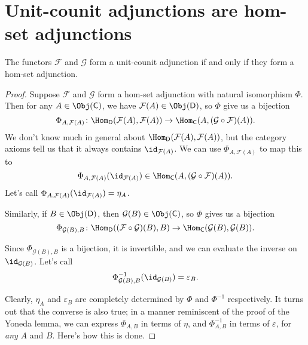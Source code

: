 \documentclass[notes.tex]{subfiles}
\begin{document}
\section{Unit-counit adjunctions are hom-set adjunctions}
\label{sec:unit_counit_adjunctions_are_hom_set_adjunctions}

\begin{lemma}
  The functors $\mathcal{F}$ and $\mathcal{G}$ form a unit-counit adjunction if and only if they form a hom-set adjunction.
\end{lemma}
\begin{proof}
  Suppose $\mathcal{F}$ and $\mathcal{G}$ form a hom-set adjunction with natural isomorphism $\Phi$. Then for any $A \in \Obj(\mathsf{C})$, we have $\mathcal{F}(A) \in \Obj(\mathsf{D})$, so $\Phi$ give us a bijection
  \begin{equation*}
    \Phi_{A, \mathcal{F}(A)}\colon \Hom_{\mathsf{D}}(\mathcal{F}(A), \mathcal{F}(A)) \to \Hom_{\mathsf{C}}(A, (\mathcal{G} \circ \mathcal{F})(A)).
  \end{equation*}
  We don't know much in general about $\Hom_{\mathsf{D}}(\mathcal{F}(A), \mathcal{F}(A))$, but the category axioms tell us that it always contains $\id_{\mathcal{F}(A)}$. We can use $\Phi_{A, \mathcal{F}(A)}$ to map this to
  \begin{equation*}
    \Phi_{A, \mathcal{F}(A)}(\id_{\mathcal{F}(A)}) \in \Hom_{\mathsf{C}}(A, (\mathcal{G} \circ \mathcal{F})(A)).
  \end{equation*}
  Let's call $\Phi_{A, \mathcal{F}(A)}(\id_{\mathcal{F}(A)}) = \eta_{A}$.

  Similarly, if $B \in \Obj(\mathsf{D})$, then $\mathcal{G}(B) \in \Obj(\mathsf{C})$, so $\Phi$ gives us a bijection
  \begin{equation*}
    \Phi_{\mathcal{G}(B), B}\colon \Hom_{\mathsf{D}}((\mathcal{F} \circ \mathcal{G})(B), B) \to \Hom_{\mathsf{C}}(\mathcal{G}(B), \mathcal{G}(B)).
  \end{equation*}

  Since $\Phi_{\mathcal{G}(B), B}$ is a bijection, it is invertible, and we can evaluate the inverse on $\id_{\mathcal{G}(B)}$. Let's call
  \begin{equation*}
    \Phi^{-1}_{\mathcal{G}(B), B}(\id_{\mathcal{G}(B)}) = \varepsilon_{B}.
  \end{equation*}

  Clearly, $\eta_{A}$ and $\varepsilon_{B}$ are completely determined by $\Phi$ and $\Phi^{-1}$ respectively. It turns out that the converse is also true; in a manner reminiscent of the proof of the Yoneda lemma, we can express $\Phi_{A, B}$ in terms of $\eta$, and $\Phi^{-1}_{A, B}$ in terms of $\varepsilon$, for \emph{any} $A$ and $B$. Here's how this is done.


\end{proof}
\end{document}
